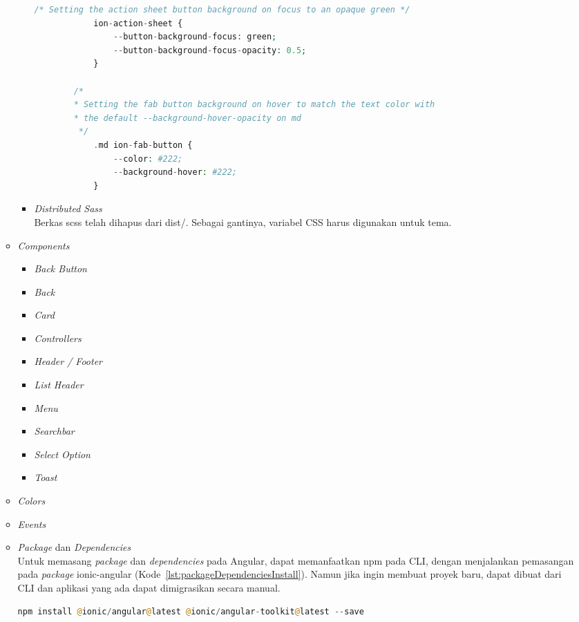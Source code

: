 \begin{enumerate}
\begin{itemize}
\begin{itemize}
\begin{lstlisting}[language=php, label={lst:hoverStates}, caption=Contoh Kode {\it Hover States} pada Ionic 5]
		/* Setting the action sheet button background on focus to an opaque green */
			ion-action-sheet {
				--button-background-focus: green;
				--button-background-focus-opacity: 0.5;
			}

		/*
 		* Setting the fab button background on hover to match the text color with
 		* the default --background-hover-opacity on md
		 */
			.md ion-fab-button {
				--color: #222;
				--background-hover: #222;
			}
		\end{lstlisting} 

			\item {\it Distributed Sass} \\
			Berkas scss telah dihapus dari dist/. Sebagai gantinya, variabel CSS harus digunakan untuk tema.

		\end{itemize}

		\item {\it Components}
		\begin{itemize}
			\item {\it Back Button}
			\item {\it Back}
			\item {\it Card}
			\item {\it Controllers}
			\item {\it Header / Footer}
			\item {\it List Header}
			\item {\it Menu}
			\item {\it Searchbar}
			\item {\it Select Option}
			\item {\it Toast}
		\end{itemize}

		\item {\it Colors}
		
		\item {\it Events}
		
		\item {\it Package} dan {\it Dependencies} \\
		Untuk memasang {\it package} dan {\it dependencies} pada Angular, dapat memanfaatkan npm pada CLI, dengan menjalankan pemasangan pada {\it package} ionic-angular  (Kode~\ref{lst:packageDependenciesInstall}). Namun jika ingin membuat proyek baru, dapat dibuat dari CLI dan aplikasi yang ada dapat dimigrasikan secara manual.
		\begin{lstlisting}[language=php, label={lst:packageDependenciesInstall}, caption=Kode untuk Memasang {\it Package} dan {\it Dependencies} pada Angular]
			npm install @ionic/angular@latest @ionic/angular-toolkit@latest --save
		\end{lstlisting} 
	\end{itemize}


\end{enumerate}




